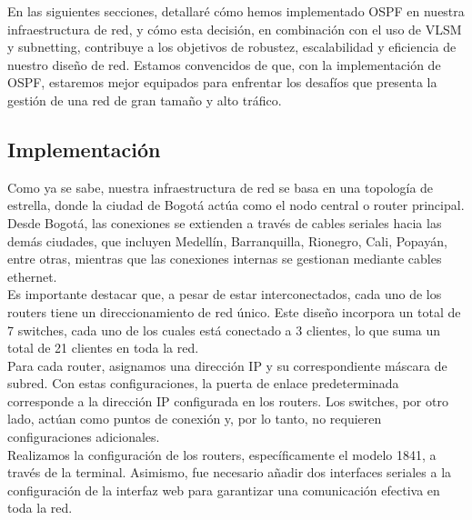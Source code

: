 En las siguientes secciones, detallaré cómo hemos implementado OSPF en nuestra
infraestructura de red, y cómo esta decisión, en combinación con el uso de VLSM
y subnetting, contribuye a los objetivos de robustez, escalabilidad y
eficiencia de nuestro diseño de red. Estamos convencidos de que, con la
implementación de OSPF, estaremos mejor equipados para enfrentar los desafíos
que presenta la gestión de una red de gran tamaño y alto tráfico.

\subsection{Implementación}

Como ya se sabe, nuestra infraestructura de red se basa en una topología de
estrella, donde la ciudad de Bogotá actúa como el nodo central o router
principal. Desde Bogotá, las conexiones se extienden a través de cables seriales
hacia las demás ciudades, que incluyen Medellín, Barranquilla, Rionegro, Cali,
Popayán, entre otras, mientras que las conexiones internas se gestionan mediante
cables ethernet.
\\

Es importante destacar que, a pesar de estar interconectados, cada uno de los
routers tiene un direccionamiento de red único. Este diseño incorpora un total
de 7 switches, cada uno de los cuales está conectado a 3 clientes, lo que suma
un total de 21 clientes en toda la red.
\\

Para cada router, asignamos una dirección IP y su correspondiente máscara de
subred. Con estas configuraciones, la puerta de enlace predeterminada
corresponde a la dirección IP configurada en los routers. Los switches, por otro
lado, actúan como puntos de conexión y, por lo tanto, no requieren configuraciones adicionales.
\\

Realizamos la configuración de los routers, específicamente el modelo 1841, a
través de la terminal. Asimismo, fue necesario añadir dos interfaces seriales a
la configuración de la interfaz web para garantizar una comunicación efectiva en
toda la red.

